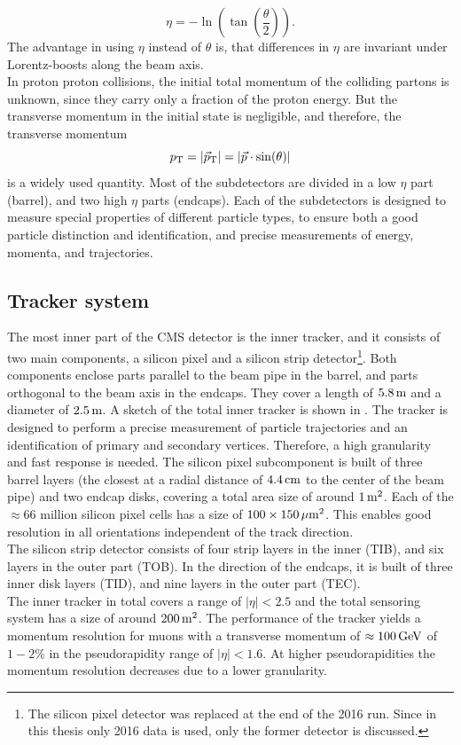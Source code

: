 \begin{equation}
 \eta=-\ln\left(\tan\left(\frac{\theta}{2}\right)\right).
\end{equation}
The advantage in using $\eta$ instead of $\theta$ is, that differences in $\eta$ are invariant under Lorentz-boosts along the beam axis.\\
In proton proton collisions, the initial total momentum of the colliding partons is unknown, since they carry only a fraction of the proton energy. But the transverse momentum in the initial state is negligible, and therefore, the transverse momentum
\begin{equation}
 p_{\mathrm{T}}=|{\vec p}_{\mathrm{T}}|=|\vec{p}\cdot\sin(\theta)|
\end{equation}
is a widely used quantity.
Most of the subdetectors are divided in a low $\eta$ part (barrel), and two high $\eta$ parts (endcaps). Each of the subdetectors is designed to measure special properties of different particle types, to ensure both a good particle distinction and identification, and precise measurements of energy, momenta, and trajectories.



\subsection{Tracker system}
The most inner part of the CMS detector is the inner tracker, and it consists of two main components, a silicon pixel and a silicon strip detector\footnote{The silicon pixel detector was replaced at the end of the 2016 run. Since in this thesis only 2016 data is used, only the former detector is discussed.}. Both components enclose parts parallel to the beam pipe in the barrel, and parts orthogonal to the beam axis in the endcaps. They cover a length of $5.8\,\text{m}$ and a diameter of $2.5\,\text{m}$. A sketch of the total inner tracker is shown in . The tracker is designed to perform a precise measurement of particle trajectories and an identification of primary and secondary vertices. Therefore, a high granularity and fast response is needed. The silicon pixel subcomponent is built of three barrel layers (the closest at a radial distance of $4.4\,\text{cm}$ to the center of the beam pipe) and two endcap disks, covering a total area size of around $1\,\text{m}^2$. Each of the $\approx66$ million silicon pixel cells has a size of $100\times150\,\mu\text{m}^2$. This enables good resolution in all orientations independent of the track direction.\\
The silicon strip detector consists of four strip layers in the inner (TIB), and six layers in the outer part (TOB). In the direction of the endcaps, it is built of three inner disk layers (TID), and nine layers in the outer part (TEC).\\
The inner tracker in total covers a range of $|\eta|<2.5$ and the total sensoring system has a size of around $200\,\text{m}^2$. The performance of the tracker yields a momentum resolution for muons with a transverse momentum of $\approx100\,\text{Ge\hspace{-.08em}V}$ of $1-2\%$ in the pseudorapidity range of $|\eta|<1.6$. At higher pseudorapidities the momentum resolution decreases due to a lower granularity.


